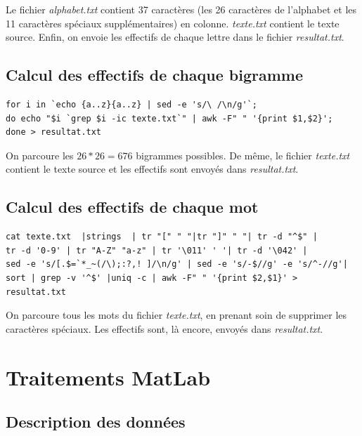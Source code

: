 \documentclass[a4paper, titlepage]{livret}
\begin{document}
Le fichier \emph{alphabet.txt} contient 37 caractères (les 26 caractères de l'alphabet et les 11 caractères spéciaux supplémentaires) en colonne.
\emph{texte.txt} contient le texte source.
Enfin, on envoie les effectifs de chaque lettre dans le fichier \emph{resultat.txt}.

\section{Calcul des effectifs de chaque bigramme}
\begin{verbatim}
for i in `echo {a..z}{a..z} | sed -e 's/\ /\n/g'`; 
do echo "$i `grep $i -ic texte.txt`" | awk -F" " '{print $1,$2}'; 
done > resultat.txt
\end{verbatim}

On parcoure les $26*26 = 676$ bigrammes possibles.
De même, le fichier \emph{texte.txt} contient le texte source et les effectifs sont envoyés dans \emph{resultat.txt}.

\section{Calcul des effectifs de chaque mot}
\begin{verbatim}
cat texte.txt  |strings  | tr "[" " "|tr "]" " "| tr -d "^$" | 
tr -d '0-9' | tr "A-Z" "a-z" | tr '\011' ' '| tr -d '\042' | 
sed -e 's/[.$=`*_~(/\);:?,! ]/\n/g' | sed -e 's/-$//g' -e 's/^-//g'| 
sort | grep -v '^$' |uniq -c | awk -F" " '{print $2,$1}' > resultat.txt
\end{verbatim}

On parcoure tous les mots du fichier \emph{texte.txt}, en prenant soin de supprimer les caractères spéciaux.
Les effectifs sont, là encore, envoyés dans \emph{resultat.txt}.

\chapter{Traitements MatLab}
\section{Description des données}
\end{document}
